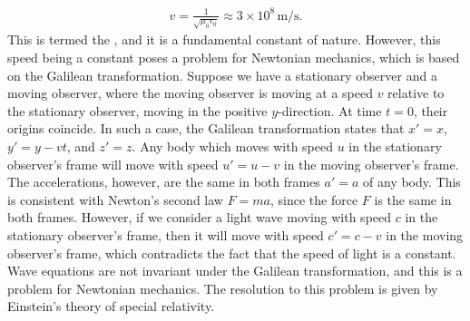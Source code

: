 \begin{align}
    v = \frac{1}{\sqrt{\mu_{0} \epsilon_{0}}} \approx 3 \times 10^{8} \, \text{m/s}.
\end{align}
This is termed the , and it is a fundamental constant of nature. However, this speed being a constant poses a problem for Newtonian mechanics, which is based on the Galilean transformation. Suppose we have a stationary observer and a moving observer, where the moving observer is moving at a speed $v$ relative to the stationary observer, moving in the positive $y$-direction. At time $t = 0$, their origins coincide. In such a case, the Galilean transformation states that $x' = x$, $y' = y - vt$, and $z' = z$. Any body which moves with speed $u$ in the stationary observer's frame will move with speed $u' = u - v$ in the moving observer's frame. The accelerations, however, are the same in both frames $a' = a$ of any body. This is consistent with Newton's second law $F = ma$, since the force $F$ is the same in both frames. However, if we consider a light wave moving with speed $c$ in the stationary observer's frame, then it will move with speed $c' = c - v$ in the moving observer's frame, which contradicts the fact that the speed of light is a constant. Wave equations are not invariant under the Galilean transformation, and this is a problem for Newtonian mechanics. The resolution to this problem is given by Einstein's theory of special relativity.

